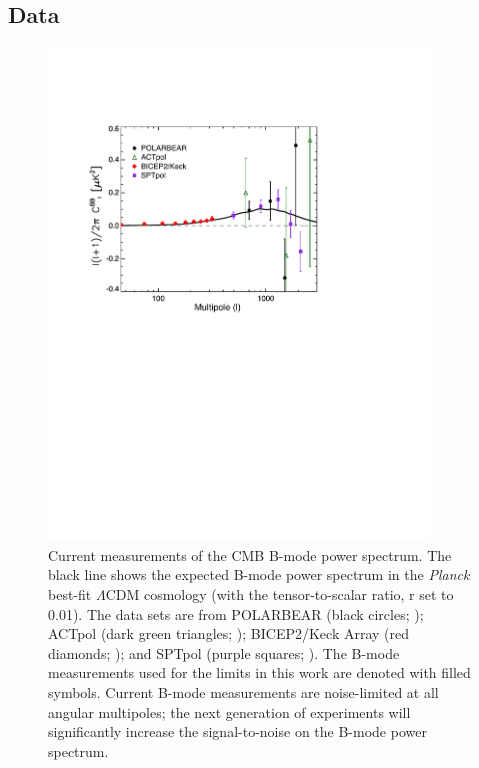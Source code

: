 \documentclass[apj]{emulateapj}
\newcommand{\lcdm}{\ensuremath{\Lambda}CDM}
\newcommand{\planck}{{\sl Planck}}
\begin{document}
\subsection{Data}

\begin{figure}[htb]\centering
\includegraphics[width=0.9\textwidth,clip,trim={1.5cm 12.5cm 5cm 3.8cm}]{pmf_experiments.pdf}
  \caption[Current measurements of CMB B-modes]{
  Current measurements of the CMB B-mode power spectrum. 
    The black line shows the expected B-mode power spectrum in the \planck{} best-fit \lcdm{} cosmology (with the tensor-to-scalar ratio, r set to 0.01). 
  The data sets are from POLARBEAR (black circles; \citet{polarbear14b}); ACTpol (dark green triangles; \citet{naess14});  BICEP2/Keck Array (red diamonds; \citet{bicepkeck15}); and SPTpol (purple squares; \citet{keisler15}). 
      The B-mode measurements used for the limits in this work are denoted with filled symbols. 
      Current B-mode measurements are noise-limited at all angular multipoles; the next generation of experiments will significantly increase the signal-to-noise on the B-mode power spectrum. 
           \label{fig:pmf-experiments}
  }
\end{figure}
\end{document}
